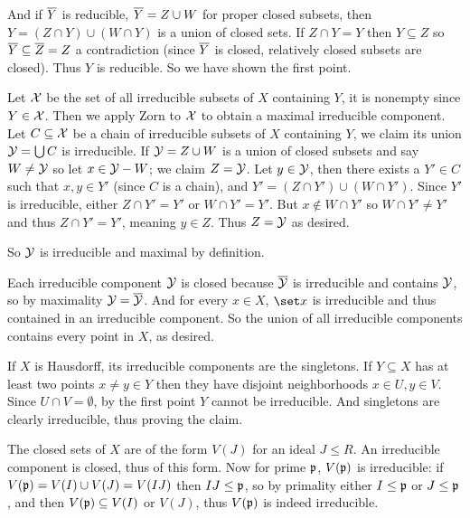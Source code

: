     And if ${\overline{Y}}$ is reducible, ${\overline{Y}}=Z\cup W$ for proper closed subsets, then $Y=(Z\cap Y)\cup(W\cap Y)$ is a union of closed sets.
    If $Z\cap Y=Y$ then $Y\subseteq Z$ so ${\overline{Y}}\subseteq{\overline{Z}}=Z$ a contradiction (since ${\overline{Y}}$ is closed, relatively closed subsets are closed).
    Thus $Y$ is reducible.
    So we have shown the first point.

    Let ${\cal X}$ be the set of all irreducible subsets of $X$ containing $Y$, it is nonempty since $Y\in{\cal X}$.
    Then we apply Zorn to ${\cal X}$ to obtain a maximal irreducible component.
    Let $C\subseteq{\cal X}$ be a chain of irreducible subsets of $X$ containing $Y$, we claim its union ${\cal Y}=\bigcup C$ is irreducible.
    If ${\cal Y}=Z\cup W$ is a union of closed subsets and say $W\neq{\cal Y}$ so let $x\in{\cal Y}-W$; we claim $Z={\cal Y}$.
    Let $y\in{\cal Y}$, then there exists a $Y'\in C$ such that $x,y\in Y'$ (since $C$ is a chain), and $Y'=(Z\cap Y')\cup(W\cap Y')$.
    Since $Y'$ is irreducible, either $Z\cap Y'=Y'$ or $W\cap Y'=Y'$.
    But $x\notin W\cap Y'$ so $W\cap Y'\neq Y'$ and thus $Z\cap Y'=Y'$, meaning $y\in Z$.
    Thus $Z={\cal Y}$ as desired.

    So ${\cal Y}$ is irreducible and maximal by definition.

    \item Each irreducible component ${\cal Y}$ is closed because ${\overline{{\cal Y}}}$ is irreducible and contains ${\cal Y}$, so by maximality ${\cal Y}={\overline{{\cal Y}}}$.
    And for every $x\in X$, $\set x$ is irreducible and thus contained in an irreducible component.
    So the union of all irreducible components contains every point in $X$, as desired.

    \item If $X$ is Hausdorff, its irreducible components are the singletons.
    If $Y\subseteq X$ has at least two points $x\neq y\in Y$ then they have disjoint neighborhoods $x\in U,y\in V$.
    Since $U\cap V=\emptyset$, by the first point $Y$ cannot be irreducible.
    And singletons are clearly irreducible, thus proving the claim.

    \item
    \benum
        \item The closed sets of $X$ are of the form $V(J)$ for an ideal $J\leq R$.
        An irreducible component is closed, thus of this form.
        Now for prime ${{\frak p}}$, $V({{\frak p}})$ is irreducible: if $V({{\frak p}})=V(I)\cup V(J)=V(IJ)$ then $IJ\leq{{\frak p}}$, so by primality either $I\leq{{\frak p}}$ or $J\leq{{\frak p}}$, and then $V({{\frak p}})\subseteq V(I)$ or $V(J)$,
        thus $V({{\frak p}})$ is indeed irreducible.

